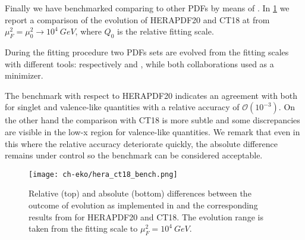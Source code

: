 Finally we have benchmarked \eko{} comparing to other PDFs by means of \lhapdf{}.
In \cref{fig:eko/Hera_ct18_bench} we report a comparison of the evolution of
HERAPDF20 and CT18 at \nnlo{} from $\mu_{F}^2=\mu_{0}^2 \rightarrow 10^4~GeV$, where
$Q_{0}$ is the relative fitting scale.

During the fitting procedure two PDFs sets are evolved from the fitting scales
with different tools: respectively \hoppet{} and \qcdnum{}, while both collaborations used
\xfitter{} as a minimizer.

The benchmark with respect to HERAPDF20 indicates an agreement with \eko{}
both for singlet and valence-like quantities with a relative accuracy of $\mathcal{O}(10^{-3})$.
On the other hand the comparison with CT18 is more subtle and some discrepancies are visible
in the low-x region for valence-like quantities. We remark that even in this where the relative accuracy
deteriorate quickly, the absolute difference remains under control so the benchmark can be considered
acceptable.


\begin{figure}
      \texttt{[image: ch-eko/hera\_ct18\_bench.png]}
      \caption{Relative (top)  and absolute (bottom) differences between
          the outcome of \nnlo{} \qcd{} evolution
          as implemented in \eko{} and the
          corresponding results from \lhapdf{} for HERAPDF20 and CT18.
          The evolution range is taken from the fitting scale to $\mu_{F}^2=10^4~GeV$.
          \label{fig:eko/Hera_ct18_bench} }
  \end{figure}
